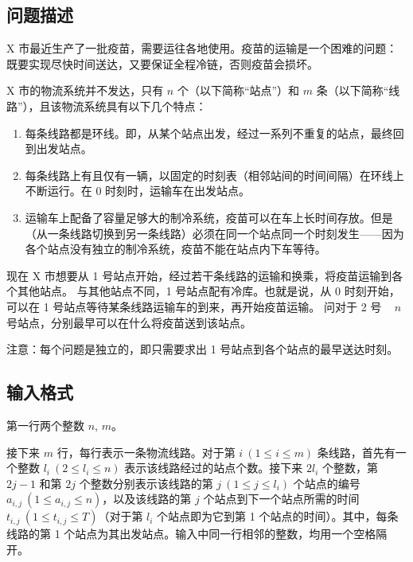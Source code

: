 \subsection*{问题描述}

X 市最近生产了一批疫苗，需要运往各地使用。疫苗的运输是一个困难的问题：既要实现尽快时间送达，又要保证全程冷链，否则疫苗会损坏。

X 市的物流系统并不发达，只有 $n$ 个{}（以下简称“站点”）和 $m$ 条{}（以下简称“线路”），且该物流系统具有以下几个特点：

\begin{enumerate}

    \item 每条线路都是环线。即，从某个站点出发，经过一系列不重复的站点，最终回到出发站点。

    \item 每条线路上有且仅有一辆{}，以固定的时刻表（相邻站间的时间间隔）在环线上不断运行。在 0 时刻时，运输车在出发站点。

    \item 运输车上配备了容量足够大的制冷系统，疫苗可以在车上长时间存放。但是{}（从一条线路切换到另一条线路）必须在同一个站点同一个时刻发生——因为各个站点没有独立的制冷系统，疫苗不能在站点内下车等待。

\end{enumerate}

现在 X 市想要从 1 号站点开始，经过若干条线路的运输和换乘，将疫苗运输到各个其他站点。
与其他站点不同，1 号站点配有冷库。也就是说，从 0 时刻开始，可以在 1 号站点等待某条线路运输车的到来，再开始疫苗运输。
问对于 2 号 ~ $n$ 号站点，分别最早可以在什么{}将疫苗送到该站点。

注意：每个问题是独立的，即只需要求出 1 号站点到各个站点的最早送达时刻。


\subsection*{输入格式}

第一行两个整数 $n$, $m$。

接下来 $m$ 行，每行表示一条物流线路。对于第 $i ~ (1 \le i \le m)$ 条线路，首先有一个整数 $l_i ~ (2 \le l_i \le n)$ 表示该线路经过的站点个数。接下来 $2 l_i$ 个整数，第 $2j-1$ 和第 $2j$ 个整数分别表示该线路的第 $j ~ (1 \le j \le l_i)$ 个站点的编号 $a_{i,j} ~ (1 \le a_{i,j} \le n)$，以及该线路的第 $j$ 个站点到下一个站点所需的时间 $t_{i,j} ~ (1 \le t_{i,j} \le T)$（对于第 $l_i$ 个站点即为它到第 1 个站点的时间）。其中，每条线路的第 1 个站点为其出发站点。输入中同一行相邻的整数，均用一个空格隔开。


